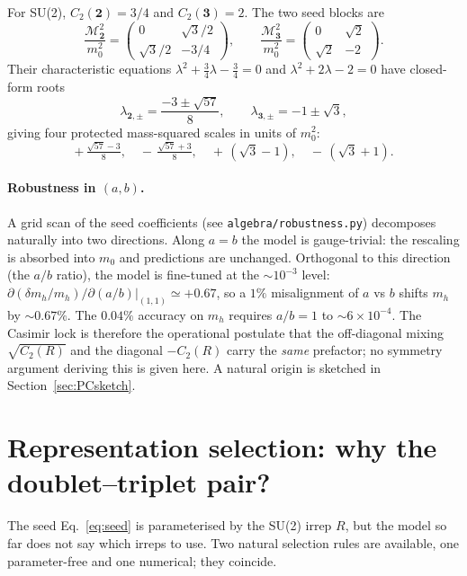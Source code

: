 \documentclass[11pt,a4paper]{article}
\newcommand{\md}{\mathbf{2}}
\newcommand{\mt}{\mathbf{3}}
\newcommand{\Cas}{C_2}
\begin{document}
For SU(2), $\Cas(\md) = 3/4$ and $\Cas(\mt) = 2$. The two seed blocks are
\begin{equation}
  \frac{\mathcal M_{\md}^2}{m_0^2} = \begin{pmatrix} 0 & \sqrt{3}/2 \\
  \sqrt{3}/2 & -3/4 \end{pmatrix},
  \qquad
  \frac{\mathcal M_{\mt}^2}{m_0^2} = \begin{pmatrix} 0 & \sqrt{2} \\
  \sqrt{2} & -2 \end{pmatrix}.
\end{equation}
Their characteristic equations $\lambda^2 + \tfrac{3}{4}\lambda - \tfrac{3}{4} = 0$
and $\lambda^2 + 2\lambda - 2 = 0$ have closed-form roots
\begin{equation}
  \lambda_{\md,\pm} = \frac{-3 \pm \sqrt{57}}{8},
  \qquad
  \lambda_{\mt,\pm} = -1 \pm \sqrt{3},
\label{eq:eigs}
\end{equation}
giving four protected mass-squared scales in units of $m_0^2$:
\[
  +\,\tfrac{\sqrt{57}-3}{8},\quad
  -\,\tfrac{\sqrt{57}+3}{8},\quad
  +\,(\sqrt{3}-1),\quad
  -\,(\sqrt{3}+1).
\]

\paragraph{Robustness in $(a, b)$.} A grid scan of the seed coefficients
(see \texttt{algebra/robustness.py}) decomposes naturally into two
directions. Along $a = b$ the model is gauge-trivial: the rescaling is
absorbed into $m_0$ and predictions are unchanged. Orthogonal to this
direction (the $a/b$ ratio), the model is fine-tuned at the $\sim 10^{-3}$
level: $\partial(\delta m_h / m_h)/\partial(a/b)\big|_{(1,1)}
\simeq +0.67$, so a $1\%$ misalignment of $a$ vs $b$ shifts $m_h$ by
$\sim 0.67\%$. The $0.04\%$ accuracy on $m_h$ requires $a/b = 1$ to
$\sim\!6 \times 10^{-4}$. The Casimir lock is therefore the operational
postulate that the off-diagonal mixing $\sqrt{\Cas(R)}$ and the diagonal
$-\Cas(R)$ carry the \emph{same} prefactor; no symmetry argument
deriving this is given here. A natural origin is sketched in
Section~\ref{sec:PCsketch}.

\section{Representation selection: why the doublet--triplet pair?}
\label{sec:repsel}

The seed Eq.~\eqref{eq:seed} is parameterised by the SU(2) irrep $R$,
but the model so far does not say which irreps to use. Two natural
selection rules are available, one parameter-free and one numerical;
they coincide.
\end{document}
